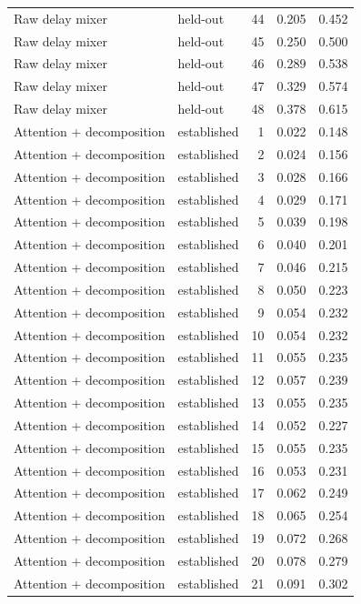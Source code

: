 \begin{tabular}{llrrr}
Raw delay mixer & held-out & 44 & 0.205 & 0.452 \\
Raw delay mixer & held-out & 45 & 0.250 & 0.500 \\
Raw delay mixer & held-out & 46 & 0.289 & 0.538 \\
Raw delay mixer & held-out & 47 & 0.329 & 0.574 \\
Raw delay mixer & held-out & 48 & 0.378 & 0.615 \\
Attention + decomposition & established & 1 & 0.022 & 0.148 \\
Attention + decomposition & established & 2 & 0.024 & 0.156 \\
Attention + decomposition & established & 3 & 0.028 & 0.166 \\
Attention + decomposition & established & 4 & 0.029 & 0.171 \\
Attention + decomposition & established & 5 & 0.039 & 0.198 \\
Attention + decomposition & established & 6 & 0.040 & 0.201 \\
Attention + decomposition & established & 7 & 0.046 & 0.215 \\
Attention + decomposition & established & 8 & 0.050 & 0.223 \\
Attention + decomposition & established & 9 & 0.054 & 0.232 \\
Attention + decomposition & established & 10 & 0.054 & 0.232 \\
Attention + decomposition & established & 11 & 0.055 & 0.235 \\
Attention + decomposition & established & 12 & 0.057 & 0.239 \\
Attention + decomposition & established & 13 & 0.055 & 0.235 \\
Attention + decomposition & established & 14 & 0.052 & 0.227 \\
Attention + decomposition & established & 15 & 0.055 & 0.235 \\
Attention + decomposition & established & 16 & 0.053 & 0.231 \\
Attention + decomposition & established & 17 & 0.062 & 0.249 \\
Attention + decomposition & established & 18 & 0.065 & 0.254 \\
Attention + decomposition & established & 19 & 0.072 & 0.268 \\
Attention + decomposition & established & 20 & 0.078 & 0.279 \\
Attention + decomposition & established & 21 & 0.091 & 0.302 \\

\end{tabular}
